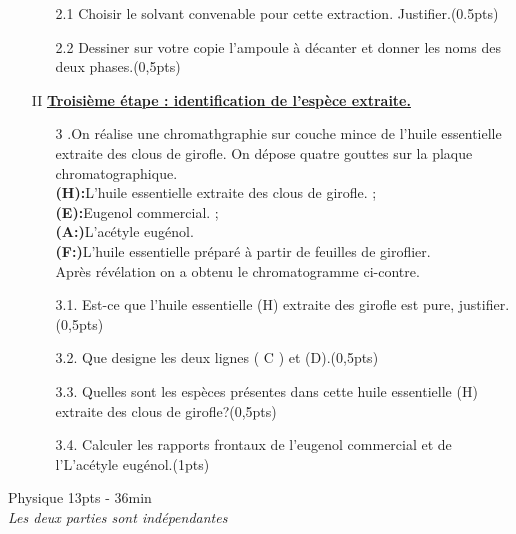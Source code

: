 \documentclass[12pt]{article}
\begin{document}
\begin{enumerate}
\begin{enumerate}
\item[2.1]Choisir le solvant convenable pour cette extraction. Justifier.\dotfill(0.5pts)
\item[2.2]Dessiner sur votre copie l’ampoule à décanter et donner les noms des deux phases.\dotfill(0,5pts)

		\end{enumerate}
		\vspace{0.5cm}	
	\item[II] \underline{\textbf{Troisième étape : identification de l’espèce extraite.}}



		\begin{enumerate}
			\item[3].On réalise une chromathgraphie sur couche mince de l’huile essentielle extraite des clous de girofle. On
dépose quatre gouttes sur la plaque chromatographique.\\\textbf{(H):}L’huile essentielle extraite des clous de girofle. ; 
\\\textbf{(E):}Eugenol commercial. ; \\\textbf{(A:)}L’acétyle eugénol.
\\\textbf{(F:)}L’huile essentielle préparé à partir de feuilles de giroflier.
\\Après révélation on a obtenu le chromatogramme ci-contre.

\item[3.1.]Est-ce que l’huile essentielle (H) extraite des girofle est pure, justifier.\dotfill(0,5pts)
\item[3.2.]Que designe les deux lignes ( C ) et (D).\dotfill(0,5pts)
\item[3.3.]Quelles sont les espèces présentes dans cette huile essentielle (H) extraite des clous de girofle?\dotfill(0,5pts)

\item[3.4.]Calculer les rapports frontaux de l’eugenol commercial et de l’L’acétyle
eugénol.\dotfill(1pts) 
		\end{enumerate}
\end{enumerate}


\begin{center}
\hrulefill
\Large{Physique 13pts - 36min}
\hrulefill\\
    \emph{Les deux parties sont indépendantes}
\end{center}
\end{document}
